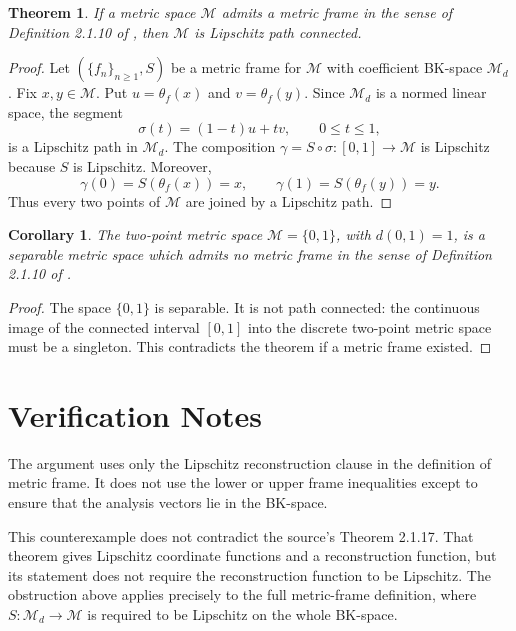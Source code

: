 \documentclass[11pt]{article}
\newtheorem{theorem}{Theorem}
\newtheorem{corollary}{Corollary}
\begin{document}
\begin{theorem}
If a metric space \(\mathcal M\) admits a metric frame in the sense of
Definition 2.1.10 of \cite{Krishna2022}, then \(\mathcal M\) is Lipschitz path
connected.
\end{theorem}

\begin{proof}
Let \((\{f_n\}_{n\ge 1},S)\) be a metric frame for \(\mathcal M\) with
coefficient BK-space \(\mathcal M_d\).  Fix \(x,y\in\mathcal M\).  Put
\(u=\theta_f(x)\) and \(v=\theta_f(y)\).  Since \(\mathcal M_d\) is a normed
linear space, the segment
\[
  \sigma(t)=(1-t)u+tv,\qquad 0\le t\le 1,
\]
is a Lipschitz path in \(\mathcal M_d\).  The composition
\(\gamma=S\circ\sigma:[0,1]\to\mathcal M\) is Lipschitz because \(S\) is
Lipschitz.  Moreover,
\[
  \gamma(0)=S(\theta_f(x))=x,\qquad
  \gamma(1)=S(\theta_f(y))=y.
\]
Thus every two points of \(\mathcal M\) are joined by a Lipschitz path.
\end{proof}

\begin{corollary}
The two-point metric space \(\mathcal M=\{0,1\}\), with
\(d(0,1)=1\), is a separable metric space which admits no metric frame in the
sense of Definition 2.1.10 of \cite{Krishna2022}.
\end{corollary}

\begin{proof}
The space \(\{0,1\}\) is separable.  It is not path connected: the continuous
image of the connected interval \([0,1]\) into the discrete two-point metric
space must be a singleton.  This contradicts the theorem if a metric frame
existed.
\end{proof}

\section*{Verification Notes}

The argument uses only the Lipschitz reconstruction clause in the definition
of metric frame.  It does not use the lower or upper frame inequalities except
to ensure that the analysis vectors lie in the BK-space.

This counterexample does not contradict the source's Theorem 2.1.17.  That
theorem gives Lipschitz coordinate functions and a reconstruction function, but
its statement does not require the reconstruction function to be Lipschitz.
The obstruction above applies precisely to the full metric-frame definition,
where \(S:\mathcal M_d\to\mathcal M\) is required to be Lipschitz on the whole
BK-space.
\end{document}
